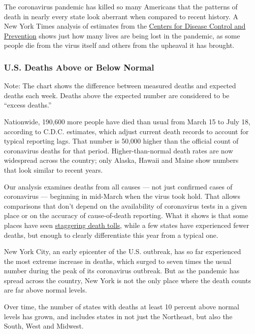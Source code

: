 The coronavirus pandemic has killed so many Americans that the patterns
of death in nearly every state look aberrant when compared to recent
history. A New York Times analysis of estimates from the
\href{https://www.cdc.gov/nchs/nvss/vsrr/covid19/excess_deaths.htm}{Centers
for Disease Control and Prevention} shows just how many lives are being
lost in the pandemic, as some people die from the virus itself and
others from the upheaval it has brought.

\hypertarget{us-deaths-above-or-below-normal}{%
\subsubsection{U.S. Deaths Above or Below
Normal}\label{us-deaths-above-or-below-normal}}

Note: The chart shows the difference between measured deaths and
expected deaths each week. Deaths above the expected number are
considered to be ``excess deaths.''

Nationwide, 190,600 more people have died than usual from March 15 to
July 18, according to C.D.C. estimates, which adjust current death
records to account for typical reporting lags. That number is 50,000
higher than the official count of coronavirus deaths for that period.
Higher-than-normal death rates are now widespread across the country;
only Alaska, Hawaii and Maine show numbers that look similar to recent
years.

Our analysis examines deaths from all causes --- not just confirmed
cases of coronavirus --- beginning in mid-March when the virus took
hold. That allows comparisons that don't depend on the availability of
coronavirus tests in a given place or on the accuracy of cause-of-death
reporting. What it shows is that some places have seen
\href{https://www.nytimes3xbfgragh.onion/interactive/2020/04/27/upshot/coronavirus-deaths-new-york-city.html}{staggering
death tolls}, while a few states have experienced fewer deaths, but
enough to clearly differentiate this year from a typical one.

New York City, an early epicenter of the U.S. outbreak, has so far
experienced the most extreme increase in deaths, which surged to seven
times the usual number during the peak of its coronavirus outbreak. But
as the pandemic has spread across the country, New York is not the only
place where the death counts are far above normal levels.

Over time, the number of states with deaths at least 10 percent above
normal levels has grown, and includes states in not just the Northeast,
but also the South, West and Midwest.

